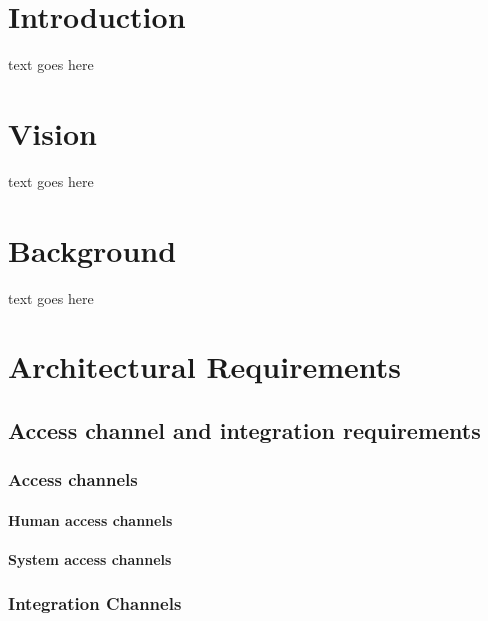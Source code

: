 \documentclass[10pt]{article}
\begin{document}

\newpage
\tableofcontents
\newpage
\listoffigures
\newpage

\section{Introduction}
text goes here

\section{Vision}
text goes here

\section{Background}
text goes here

\section{Architectural Requirements}
\subsection{Access channel and integration requirements} 
\subsubsection{Access channels}
\paragraph{Human access channels}
\paragraph{System access channels}
\subsubsection{Integration Channels}
\end{document}
